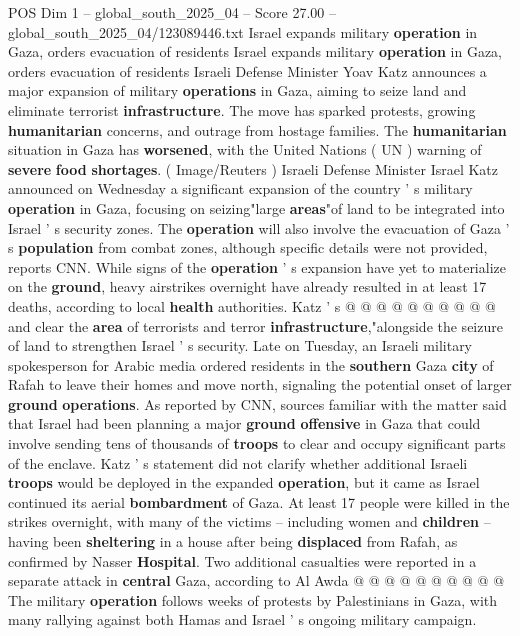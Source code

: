 \begin{textsample}{POS Dim 1 – global\_south\_2025\_04 – Score 27.00 – global\_south\_2025\_04/123089446.txt}  \label{ex:f1_pos_289}
Israel expands military \textbf{operation} in Gaza, orders evacuation of residents Israel expands military \textbf{operation} in Gaza, orders evacuation of residents Israeli Defense Minister Yoav Katz announces a major expansion of military \textbf{operations} in Gaza, aiming to seize land and eliminate terrorist \textbf{infrastructure}.
The move has sparked protests, growing \textbf{humanitarian} concerns, and outrage from hostage families.
The \textbf{humanitarian} situation in Gaza has \textbf{worsened}, with the United Nations ( UN ) warning of \textbf{severe} \textbf{food} \textbf{shortages}. ( Image/Reuters ) Israeli Defense Minister Israel Katz announced on Wednesday a significant expansion of the country ' s military \textbf{operation} in Gaza, focusing on seizing"large \textbf{areas}"of land to be integrated into Israel ' s security zones.
The \textbf{operation} will also involve the evacuation of Gaza ' s \textbf{population} from combat zones, although specific details were not provided, reports CNN.
While signs of the \textbf{operation} ' s expansion have yet to materialize on the \textbf{ground}, heavy airstrikes overnight have already resulted in at least 17 deaths, according to local \textbf{health} authorities.
Katz ' s @ @ @ @ @ @ @ @ @ @ and clear the \textbf{area} of terrorists and terror \textbf{infrastructure},"alongside the seizure of land to strengthen Israel ' s security.
Late on Tuesday, an Israeli military spokesperson for Arabic media ordered residents in the \textbf{southern} Gaza \textbf{city} of Rafah to leave their homes and move north, signaling the potential onset of larger \textbf{ground} \textbf{operations}.
As reported by CNN, sources familiar with the matter said that Israel had been planning a major \textbf{ground} \textbf{offensive} in Gaza that could involve sending tens of thousands of \textbf{troops} to clear and occupy significant parts of the enclave.
Katz ' s statement did not clarify whether additional Israeli \textbf{troops} would be deployed in the expanded \textbf{operation}, but it came as Israel continued its aerial \textbf{bombardment} of Gaza.
At least 17 people were killed in the strikes overnight, with many of the victims -- including women and \textbf{children} -- having been \textbf{sheltering} in a house after being \textbf{displaced} from Rafah, as confirmed by Nasser \textbf{Hospital}.
Two additional casualties were reported in a separate attack in \textbf{central} Gaza, according to Al Awda @ @ @ @ @ @ @ @ @ @ The military \textbf{operation} follows weeks of protests by Palestinians in Gaza, with many rallying against both Hamas and Israel ' s ongoing military campaign.

\end{textsample}
